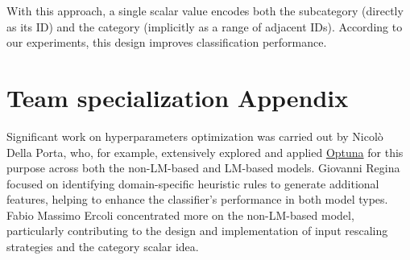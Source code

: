 \documentclass[11pt]{article}
\begin{document}
With this approach, a single scalar value encodes both the subcategory (directly as its ID) and the category (implicitly as a range of adjacent IDs). According to our experiments, this design improves classification performance.
	
\section{Team specialization Appendix}
\label{sec:appendix}
Significant work on hyperparameters optimization was carried out by Nicolò Della Porta, who, for example, extensively explored and applied \href{https://optuna.org/}{Optuna}  for this purpose across both the non-LM-based and LM-based models. Giovanni Regina focused on identifying domain-specific heuristic rules to generate additional features, helping to enhance the classifier’s performance in both model types. Fabio Massimo Ercoli concentrated more on the non-LM-based model, particularly contributing to the design and implementation of input rescaling strategies and the category scalar idea.
\end{document}
